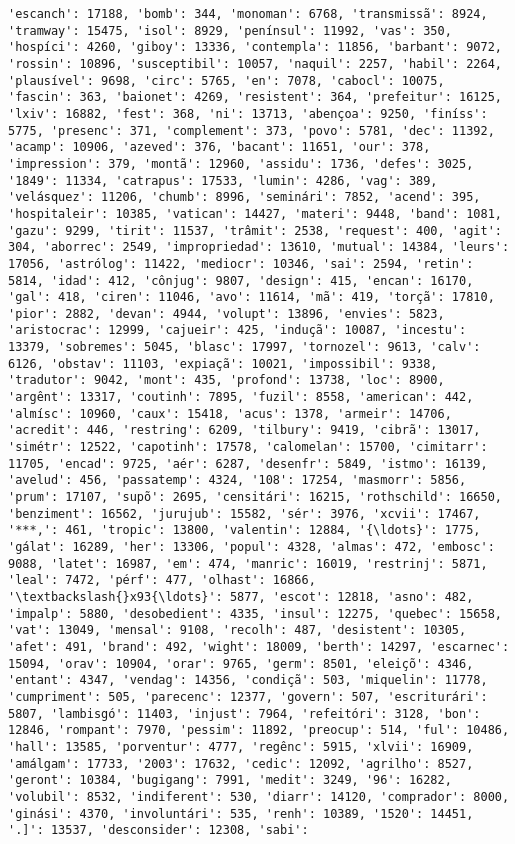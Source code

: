 \begin{Verbatim}[commandchars=\\\{\}]
'escanch': 17188, 'bomb': 344, 'monoman': 6768, 'transmissã': 8924, 'tramway': 15475, 'isol': 8929, 'penínsul': 11992, 'vas': 350, 'hospíci': 4260, 'giboy': 13336, 'contempla': 11856, 'barbant': 9072, 'rossin': 10896, 'susceptibil': 10057, 'naquil': 2257, 'habil': 2264, 'plausível': 9698, 'circ': 5765, 'en': 7078, 'cabocl': 10075, 'fascin': 363, 'baionet': 4269, 'resistent': 364, 'prefeitur': 16125, 'lxiv': 16882, 'fest': 368, 'ni': 13713, 'abençoa': 9250, 'finíss': 5775, 'presenc': 371, 'complement': 373, 'povo': 5781, 'dec': 11392, 'acamp': 10906, 'azeved': 376, 'bacant': 11651, 'our': 378, 'impression': 379, 'montã': 12960, 'assidu': 1736, 'defes': 3025, '1849': 11334, 'catrapus': 17533, 'lumin': 4286, 'vag': 389, 'velásquez': 11206, 'chumb': 8996, 'seminári': 7852, 'acend': 395, 'hospitaleir': 10385, 'vatican': 14427, 'materi': 9448, 'band': 1081, 'gazu': 9299, 'tirit': 11537, 'trâmit': 2538, 'request': 400, 'agit': 304, 'aborrec': 2549, 'impropriedad': 13610, 'mutual': 14384, 'leurs': 17056, 'astrólog': 11422, 'mediocr': 10346, 'sai': 2594, 'retin': 5814, 'idad': 412, 'cônjug': 9807, 'design': 415, 'encan': 16170, 'gal': 418, 'ciren': 11046, 'avo': 11614, 'mã': 419, 'torçã': 17810, 'pior': 2882, 'devan': 4944, 'volupt': 13896, 'envies': 5823, 'aristocrac': 12999, 'cajueir': 425, 'induçã': 10087, 'incestu': 13379, 'sobremes': 5045, 'blasc': 17997, 'tornozel': 9613, 'calv': 6126, 'obstav': 11103, 'expiaçã': 10021, 'impossibil': 9338, 'tradutor': 9042, 'mont': 435, 'profond': 13738, 'loc': 8900, 'argênt': 13317, 'coutinh': 7895, 'fuzil': 8558, 'american': 442, 'almísc': 10960, 'caux': 15418, 'acus': 1378, 'armeir': 14706, 'acredit': 446, 'restring': 6209, 'tilbury': 9419, 'cibrã': 13017, 'simétr': 12522, 'capotinh': 17578, 'calomelan': 15700, 'cimitarr': 11705, 'encad': 9725, 'aér': 6287, 'desenfr': 5849, 'istmo': 16139, 'avelud': 456, 'passatemp': 4324, '108': 17254, 'masmorr': 5856, 'prum': 17107, 'supõ': 2695, 'censitári': 16215, 'rothschild': 16650, 'benziment': 16562, 'jurujub': 15582, 'sér': 3976, 'xcvii': 17467, '***,': 461, 'tropic': 13800, 'valentin': 12884, '{\ldots}': 1775, 'gálat': 16289, 'her': 13306, 'popul': 4328, 'almas': 472, 'embosc': 9088, 'latet': 16987, 'em': 474, 'manric': 16019, 'restrinj': 5871, 'leal': 7472, 'pérf': 477, 'olhast': 16866, '\textbackslash{}x93{\ldots}': 5877, 'escot': 12818, 'asno': 482, 'impalp': 5880, 'desobedient': 4335, 'insul': 12275, 'quebec': 15658, 'vat': 13049, 'mensal': 9108, 'recolh': 487, 'desistent': 10305, 'afet': 491, 'brand': 492, 'wight': 18009, 'berth': 14297, 'escarnec': 15094, 'orav': 10904, 'orar': 9765, 'germ': 8501, 'eleiçõ': 4346, 'entant': 4347, 'vendag': 14356, 'condiçã': 503, 'miquelin': 11778, 'cumpriment': 505, 'parecenc': 12377, 'govern': 507, 'escriturári': 5807, 'lambisgó': 11403, 'injust': 7964, 'refeitóri': 3128, 'bon': 12846, 'rompant': 7970, 'pessim': 11892, 'preocup': 514, 'ful': 10486, 'hall': 13585, 'porventur': 4777, 'regênc': 5915, 'xlvii': 16909, 'amálgam': 17733, '2003': 17632, 'cedic': 12092, 'agrilho': 8527, 'geront': 10384, 'bugigang': 7991, 'medit': 3249, '96': 16282, 'volubil': 8532, 'indiferent': 530, 'diarr': 14120, 'comprador': 8000, 'ginási': 4370, 'involuntári': 535, 'renh': 10389, '1520': 14451, '.]': 13537, 'desconsider': 12308, 'sabi': 
\end{Verbatim}
